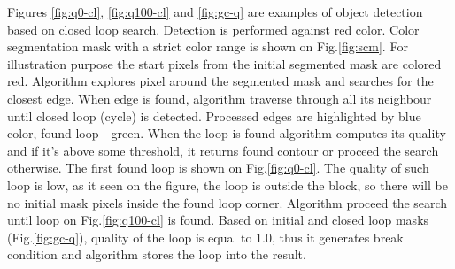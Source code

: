 \documentclass{ctuthesis}
\begin{document}
Figures \ref{fig:q0-cl}, \ref{fig:q100-cl} and \ref{fig:gc-q} are examples of object detection based on closed loop search. Detection is performed against red color. Color segmentation mask with a strict color range is shown on Fig.\ref{fig:scm}. For illustration purpose the start pixels from the initial segmented mask are colored red. Algorithm explores pixel around the segmented mask and searches for the closest edge. When edge is found, algorithm traverse through all its neighbour until closed loop (cycle) is detected. Processed edges are highlighted by blue color, found loop - green. When the loop is found algorithm computes its quality and if it's above some threshold, it returns found contour or proceed the search otherwise. The first found loop is shown on Fig.\ref{fig:q0-cl}. The quality of such loop is low, as it seen on the figure, the loop is outside the block, so there will be no initial mask pixels inside the found loop corner. Algorithm proceed the search until loop on Fig.\ref{fig:q100-cl} is found. Based on initial and closed loop masks (Fig.\ref{fig:gc-q}), quality of the loop is equal to 1.0, thus it generates break condition and algorithm stores the loop into the result.
\end{document}
